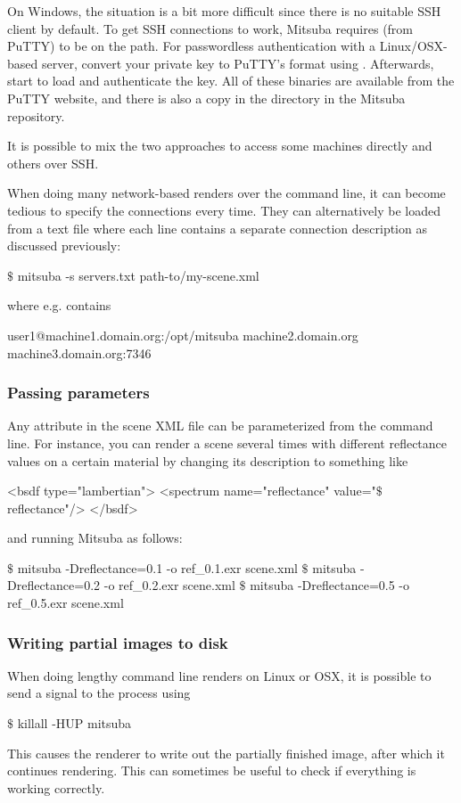 \begin{itemize}
	On Windows, the situation is a bit more difficult since there is no suitable SSH client by
	default. To get SSH connections to work, Mitsuba requires  (from PuTTY) to
	be on the path. For passwordless authentication with a Linux/OSX-based
	server, convert your private key to PuTTY's format using .
	Afterwards, start  to load and  authenticate the key. All 
	of these binaries are available from the PuTTY website, and there is also
	a copy in the 
	directory in the Mitsuba repository.

	It is possible to mix the two approaches to access some machines directly and others
	over SSH.
\end{itemize}
When doing many network-based renders over the command line, it can become tedious to
specify the connections every time. They can alternatively be loaded from a text file
where each line contains a separate connection description as discussed previously:
\begin{shell}
$\texttt{\$}$ mitsuba -s servers.txt path-to/my-scene.xml
\end{shell}
where  e.g. contains
\begin{console}
user1@machine1.domain.org:/opt/mitsuba
machine2.domain.org
machine3.domain.org:7346
\end{console}
\subsubsection{Passing parameters}
Any attribute in the scene XML file can be parameterized from the
command line.
For instance, you can render a scene several times with different reflectance values
on a certain material by changing its description to something like 
\begin{xml}
<bsdf type="lambertian">
	<spectrum name="reflectance" value="$\texttt{\$}$reflectance"/>
</bsdf>
\end{xml}
and running Mitsuba as follows:
\begin{shell}
$\texttt{\$}$ mitsuba -Dreflectance=0.1 -o ref_0.1.exr scene.xml 
$\texttt{\$}$ mitsuba -Dreflectance=0.2 -o ref_0.2.exr scene.xml 
$\texttt{\$}$ mitsuba -Dreflectance=0.5 -o ref_0.5.exr scene.xml 
\end{shell}

\subsubsection{Writing partial images to disk}
When doing lengthy command line renders on Linux or OSX, it is possible 
to send a signal to the process using 
\begin{shell}	
$\texttt{\$}$ killall -HUP mitsuba
\end{shell}
This causes the renderer to write out the partially finished 
image, after which it continues rendering. This can sometimes be useful to 
check if everything is working correctly.

